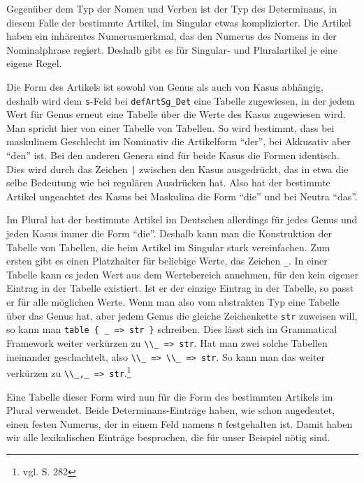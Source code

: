 Gegenüber dem Typ der Nomen und Verben ist der Typ des Determinans, in diesem Falle der bestimmte Artikel, im Singular etwas komplizierter. Die Artikel haben ein inhärentes Numerusmerkmal, das den Numerus des Nomens in der Nominalphrase regiert. Deshalb gibt es für Singular- und Pluralartikel je eine eigene Regel. \par 
Die Form des Artikels ist sowohl von Genus als auch von Kasus abhängig, deshalb wird dem \texttt{s}-Feld bei \texttt{defArtSg\_Det} eine Tabelle zugewiesen, in der jedem Wert für Genus erneut eine Tabelle über die Werte des Kasus zugewiesen wird. Man spricht hier von einer Tabelle von Tabellen. So wird bestimmt, dass bei maskulinem Geschlecht im Nominativ die Artikelform "`der"', bei Akkusativ aber "`den"' ist. Bei den anderen Genera sind für beide Kasus die Formen identisch. Dies wird durch das Zeichen \texttt{|} zwischen den Kasus ausgedrückt, das in etwa die selbe Bedeutung wie bei regulären Ausdrücken hat. Also hat der bestimmte Artikel ungeachtet des Kasus bei Maskulina die Form "`die"' und bei Neutra "`das"'. \par
Im Plural hat der bestimmte Artikel im Deutschen allerdings für jedes Genus und jeden Kasus immer die Form "`die"'. Deshalb kann man die Konstruktion der Tabelle von Tabellen, die beim Artikel im Singular stark vereinfachen. Zum ersten gibt es einen Platzhalter für beliebige Werte, das Zeichen \texttt{\_}. In einer Tabelle kann es jeden Wert aus dem Wertebereich annehmen, für den kein eigener Eintrag in der Tabelle existiert. Ist er der einzige Eintrag in der Tabelle, so passt er für alle möglichen Werte. Wenn man also vom abstrakten Typ eine Tabelle über das Genus hat, aber jedem Genus die gleiche Zeichenkette \texttt{str} zuweisen will, so kann man \texttt{table \{ \_ => str \}} schreiben. Dies lässt sich im Grammatical Framework weiter verkürzen zu \mbox{\texttt{\textbackslash{}\textbackslash{}\_ => str}}. Hat man zwei solche Tabellen ineinander geschachtelt, also \mbox{\texttt{\textbackslash{}\textbackslash{}\_ => \textbackslash{}\textbackslash{}\_ => str}}. So kann man das weiter verkürzen zu \mbox{\texttt{\textbackslash{}\textbackslash{}\_,\_ => str}}.\footnote{vgl. \cite{RANTA2011} S. 282} \par
Eine Tabelle dieser Form wird nun für die Form des bestimmten Artikels im Plural verwendet. Beide Determinans-Einträge haben, wie schon angedeutet, einen festen Numerus, der in einem Feld namens \texttt{n} festgehalten ist. Damit haben wir alle lexikalischen Einträge besprochen, die für unser Beispiel nötig sind. \par
